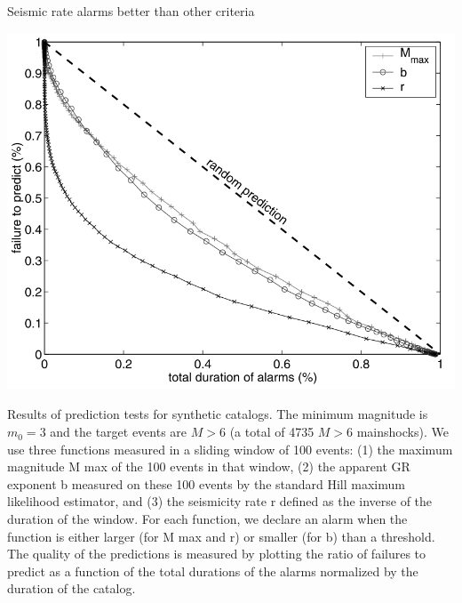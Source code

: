 \documentclass[aspectratio=43,9pt]{beamer}
\begin{document}
\begin{frame}
 {Seismic rate alarms better than other criteria}
 
 \begin{center}
   \vspace{-10pt}
  \includegraphics[width=0.5\linewidth]{Figs/fig10}
 \end{center}
   \vspace{-10pt}
   {\footnotesize Results of prediction tests for synthetic catalogs.
   The minimum magnitude is $m_0 = 3$ and the target events are $M > 6$
   (a total of 4735 $M>6$ mainshocks). We use three functions
measured in a sliding window of 100 events: (1) the maximum magnitude M max of the 100 events in
that window, (2) the apparent GR exponent b measured on these 100 events by the standard Hill
maximum likelihood estimator, and (3) the seismicity rate r defined as the inverse of the duration of
the window. For each function, we declare an alarm when the function is either larger (for M max and r)
or smaller (for b) than a threshold. The quality of the predictions is
measured by plotting the ratio of failures to predict as a function of the total durations of the alarms
normalized by the duration of the catalog.}

 
\end{frame}
\end{document}
